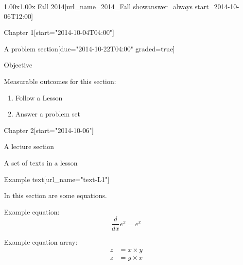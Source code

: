 \documentclass[12pt]{article}
\begin{document}
\begin{edXcourse}{1.00x}{1.00x Fall 2014}[url_name=2014_Fall showanswer=always start=2014-10-06T12:00]

\begin{edXchapter}{Chapter 1}[start="2014-10-04T04:00"]

\begin{edXsequential}{A problem section}[due="2014-10-22T04:00" graded=true]

\begin{edXtext}{Objective}

Measurable outcomes for this section:
\begin{enumerate}
  \item {} Follow a Lesson
  \item {} Answer a problem set
\end{enumerate}

\end{edXtext}

\end{edXsequential}

\end{edXchapter}

\begin{edXchapter}{Chapter 2}[start="2014-10-06"]

\begin{edXsequential}{A lecture section}

\begin{edXvertical}{A set of texts in a lesson}

\begin{edXtext}{Example text}[url_name="text-L1"]

In this section are some equations.

Example equation:
\begin{equation}
  \label{eq:deriv}
  \frac{d}{dx} e^x = e^x
\end{equation}

Example equation array:
\begin{eqnarray}
  z & = x \times y \label{eq:com1}\\
  z & = y \times x \label{eq:com2}
\end{eqnarray}


\end{edXtext}
\end{edXvertical}
\end{edXsequential}
\end{edXchapter}
\end{edXcourse}
\end{document}
